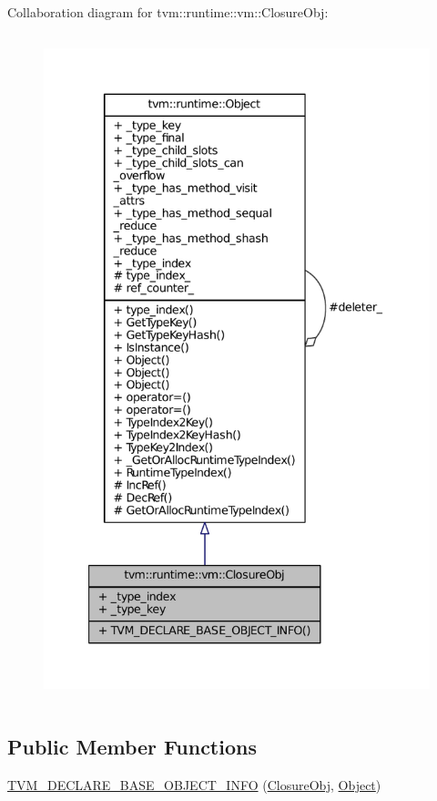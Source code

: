 Collaboration diagram for tvm\+:\+:runtime\+:\+:vm\+:\+:Closure\+Obj\+:
\nopagebreak
\begin{figure}[H]
\begin{center}
\leavevmode
\includegraphics[height=550pt]{classtvm_1_1runtime_1_1vm_1_1ClosureObj__coll__graph}
\end{center}
\end{figure}
\subsection*{Public Member Functions}
\begin{DoxyCompactItemize}
\item 
\hyperlink{classtvm_1_1runtime_1_1vm_1_1ClosureObj_a4801d292ac517cef20eddf90acfd1c25}{T\+V\+M\+\_\+\+D\+E\+C\+L\+A\+R\+E\+\_\+\+B\+A\+S\+E\+\_\+\+O\+B\+J\+E\+C\+T\+\_\+\+I\+N\+FO} (\hyperlink{classtvm_1_1runtime_1_1vm_1_1ClosureObj}{Closure\+Obj}, \hyperlink{classtvm_1_1runtime_1_1Object}{Object})
\end{DoxyCompactItemize}
